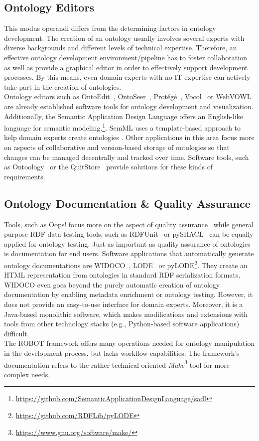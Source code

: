 \documentclass[runningheads]{llncs}
\begin{document}
\subsection{Ontology Editors}
This modus operandi differs from the determining factors in ontology development. The creation of an ontology usually involves several experts with diverse backgrounds and different levels of technical expertise. Therefore, an effective ontology development environment/pipeline has to foster collaboration as well as provide a graphical editor in order to effectively support development processes. By this means, even domain experts with no IT expertise can actively take part in the creation of ontologies.\\
Ontology editors such as OntoEdit~\cite{ontoedit}, OntoSeer~\cite{ontoseer}, Protégé~\cite{protege}, Vocol~\cite{halilaj} or WebVOWL~\cite{lohmann} are already established software tools for ontology development and visualization. Additionally, the Semantic Application Design Language offers an English-like language for semantic modeling.\footnote{\url{https://github.com/SemanticApplicationDesignLanguage/sadl}}. SemML uses a template-based approach to help domain experts create ontologies \cite{semml}. Other applications in this area focus more on aspects of collaborative and version-based storage of ontologies so that changes can be managed decentrally and tracked over time. Software tools, such as Ontoology~\cite{alobaid} or the QuitStore~\cite{arndt} provide solutions for these kinds of requirements.
\subsection{Ontology Documentation \& Quality Assurance}
Tools, such as Oops! focus more on the aspect of quality assurance~\cite{poveda} while general purpose RDF data testing tools, such as RDFUnit~\cite{rdfunit} or pySHACL~\cite{sommer} can be equally applied for ontology testing. Just as important as quality assurance of ontologies is documentation for end users. Software applications that automatically generate ontology documentations are WIDOCO~\cite{widoco}, LODE~\cite{lode} or pyLODE\footnote{\url{https://github.com/RDFLib/pyLODE}}. They create an HTML representation from ontologies in standard RDF serialization formats. WIDOCO even goes beyond the purely automatic creation of ontology documentation by enabling metadata enrichment or ontology testing. However, it does not provide an easy-to-use interface for domain experts. Moreover, it is a Java-based monolithic software, which makes modifications and extensions with tools from other technology stacks (e.g., Python-based software applications) difficult.\\
The ROBOT framework offers many operations needed for ontology manipulation in the development process, but lacks workflow capabilities. The framework's documentation refers to the rather technical oriented \textit{Make}\footnote{\url{https://www.gnu.org/software/make/}} tool for more complex needs.\\
\end{document}
